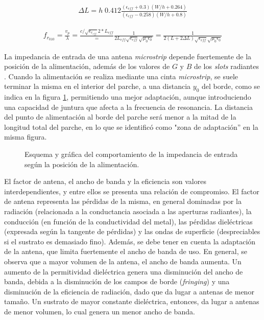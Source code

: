 \begin{align}
	\Delta L = h\; 0.412 \frac{(\epsilon_{eff}+0.3)(W/h + 0.264)}{(\epsilon_{eff}-0.258)(W/h +0.8)}
	\label{eq:deltaL-antena-microstrip}
\end{align}

\begin{align}
	f_{{r}_{010}} = \frac{v_p}{\lambda} = \frac{c/\sqrt{\epsilon_{r_{eff}}}{2*L_{eff}}} = \frac{1}{2 L_{eff} \sqrt{\epsilon_{eff}} \sqrt{\mu_0 \epsilon_0}} = \frac{1}{2 (L+2 \Delta L) \sqrt{\epsilon_{eff}} \sqrt{\mu_0 \epsilon_0}}
	\label{eq:frec-resonancia-modelo-linea-microstrip}
\end{align}

La impedancia de entrada de una antena \textit{microstrip} depende fuertemente de la posición de la alimentación, además de los valores de $G$ y $B$ de los \textit{slots} radiantes \cite{Balanis:Advanced}. Cuando la alimentación se realiza mediante una cinta \textit{microstrip}, se suele terminar la misma en el interior del parche, a una distancia $y_0$ del borde, como se indica en la figura \ref{fig:antema-microstrip-inset}, permitiendo una mejor adaptación, aunque introduciendo una capacidad de juntura que afecta a la frecuencia de resonancia. La distancia del punto de alimentación al borde del parche será menor a la mitad de la longitud total del parche, en lo que se identificó como "zona de adaptación'' en la misma figura.

\begin{figure} [H]
	\centering
	\caption{Esquema y gráfica del comportamiento de la impedancia de entrada según la posición de la alimentación.}
	\label{fig:antema-microstrip-inset}
\end{figure}


El factor de antena, el ancho de banda y la eficiencia son valores interdependientes, y entre ellos se presenta una relación de compromiso. El factor de antena representa las pérdidas de la misma, en general dominadas por la radiación (relacionada a la conductancia asociada a las aperturas radiantes), la conducción (en función de la conductividad del metal), las pérdidas dieléctricas (expresada según la tangente de pérdidas) y las ondas de superficie (despreciables si el sustrato es demasiado fino). Además, se debe tener en cuenta la adaptación de la antena, que limita fuertemente el ancho de banda de uso. En general, se observa que \cite{Balanis:Theory} a mayor volumen de la antena, el ancho de banda aumenta. Un aumento de la permitividad dieléctrica genera una disminución del ancho de banda, debida a la disminución de los campos de borde (\textit{fringing}) y una disminución de la eficiencia de radiación, dado que da lugar a antenas de menor tamaño. Un sustrato de mayor constante dieléctrica, entonces, da lugar a antenas de menor volumen, lo cual genera un menor ancho de banda.

